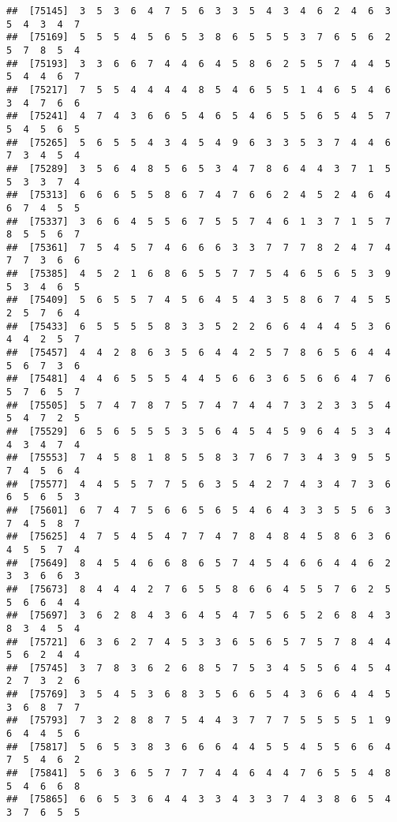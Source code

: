 \documentclass[
]{book}
\begin{document}
\begin{verbatim}
##  [75145]  3  5  3  6  4  7  5  6  3  3  5  4  3  4  6  2  4  6  3  5  4  3  4  7
##  [75169]  5  5  5  4  5  6  5  3  8  6  5  5  5  3  7  6  5  6  2  5  7  8  5  4
##  [75193]  3  3  6  6  7  4  4  6  4  5  8  6  2  5  5  7  4  4  5  5  4  4  6  7
##  [75217]  7  5  5  4  4  4  4  8  5  4  6  5  5  1  4  6  5  4  6  3  4  7  6  6
##  [75241]  4  7  4  3  6  6  5  4  6  5  4  6  5  5  6  5  4  5  7  5  4  5  6  5
##  [75265]  5  6  5  5  4  3  4  5  4  9  6  3  3  5  3  7  4  4  6  7  3  4  5  4
##  [75289]  3  5  6  4  8  5  6  5  3  4  7  8  6  4  4  3  7  1  5  5  3  3  7  4
##  [75313]  6  6  6  5  5  8  6  7  4  7  6  6  2  4  5  2  4  6  4  6  7  4  5  5
##  [75337]  3  6  6  4  5  5  6  7  5  5  7  4  6  1  3  7  1  5  7  8  5  5  6  7
##  [75361]  7  5  4  5  7  4  6  6  6  3  3  7  7  7  8  2  4  7  4  7  7  3  6  6
##  [75385]  4  5  2  1  6  8  6  5  5  7  7  5  4  6  5  6  5  3  9  5  3  4  6  5
##  [75409]  5  6  5  5  7  4  5  6  4  5  4  3  5  8  6  7  4  5  5  2  5  7  6  4
##  [75433]  6  5  5  5  5  8  3  3  5  2  2  6  6  4  4  4  5  3  6  4  4  2  5  7
##  [75457]  4  4  2  8  6  3  5  6  4  4  2  5  7  8  6  5  6  4  4  5  6  7  3  6
##  [75481]  4  4  6  5  5  5  4  4  5  6  6  3  6  5  6  6  4  7  6  5  7  6  5  7
##  [75505]  5  7  4  7  8  7  5  7  4  7  4  4  7  3  2  3  3  5  4  5  4  7  2  5
##  [75529]  6  5  6  5  5  5  3  5  6  4  5  4  5  9  6  4  5  3  4  4  3  4  7  4
##  [75553]  7  4  5  8  1  8  5  5  8  3  7  6  7  3  4  3  9  5  5  7  4  5  6  4
##  [75577]  4  4  5  5  7  7  5  6  3  5  4  2  7  4  3  4  7  3  6  6  5  6  5  3
##  [75601]  6  7  4  7  5  6  6  5  6  5  4  6  4  3  3  5  5  6  3  7  4  5  8  7
##  [75625]  4  7  5  4  5  4  7  7  4  7  8  4  8  4  5  8  6  3  6  4  5  5  7  4
##  [75649]  8  4  5  4  6  6  8  6  5  7  4  5  4  6  6  4  4  6  2  3  3  6  6  3
##  [75673]  8  4  4  4  2  7  6  5  5  8  6  6  4  5  5  7  6  2  5  5  6  6  4  4
##  [75697]  3  6  2  8  4  3  6  4  5  4  7  5  6  5  2  6  8  4  3  8  3  4  5  4
##  [75721]  6  3  6  2  7  4  5  3  3  6  5  6  5  7  5  7  8  4  4  5  6  2  4  4
##  [75745]  3  7  8  3  6  2  6  8  5  7  5  3  4  5  5  6  4  5  4  2  7  3  2  6
##  [75769]  3  5  4  5  3  6  8  3  5  6  6  5  4  3  6  6  4  4  5  3  6  8  7  7
##  [75793]  7  3  2  8  8  7  5  4  4  3  7  7  7  5  5  5  5  1  9  6  4  4  5  6
##  [75817]  5  6  5  3  8  3  6  6  6  4  4  5  5  4  5  5  6  6  4  7  5  4  6  2
##  [75841]  5  6  3  6  5  7  7  7  4  4  6  4  4  7  6  5  5  4  8  5  4  6  6  8
##  [75865]  6  6  5  3  6  4  4  3  3  4  3  3  7  4  3  8  6  5  4  3  7  6  5  5

\end{verbatim}
\end{document}
